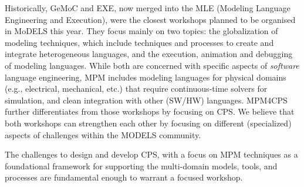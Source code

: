 Historically, GeMoC and EXE, now merged into the MLE (Modeling Language 
Engineering and Execution), were the closest workshops planned to be organised 
in MoDELS this year. They focus mainly on two topics: the globalization of
modeling techniques, which include techniques and processes to create and
integrate heterogeneous languages, and the execution, animation and debugging
of modeling languages. While both are concerned with specific aspects of 
\emph{software} language engineering, MPM includes modeling languages for 
physical domains (e.g., electrical, mechanical, etc.) that require 
continuous-time solvers for simulation, and clean integration with other (SW/HW) 
languages.
MPM4CPS further differentiates from those workshops by focusing on CPS. 
We believe that both workshops can strengthen each other by focusing on different 
(specialized) aspects of challenges within the MODELS community.

The challenges to design and develop CPS, with a focus on MPM techniques as a 
foundational framework for supporting the multi-domain models, tools, and 
processes are fundamental enough to warrant a focused workshop.
